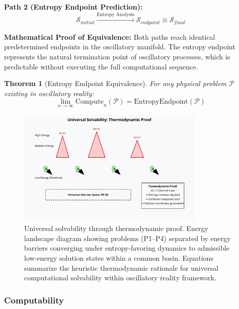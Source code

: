 \documentclass[12pt,a4paper]{article}
\newtheorem{theorem}{Theorem}
\begin{document}
\textbf{Path 2 (Entropy Endpoint Prediction):}
\begin{equation}
\mathcal{S}_{initial} \xrightarrow{\text{Entropy Analysis}} \mathcal{S}_{endpoint} \equiv \mathcal{S}_{final}
\end{equation}

\textbf{Mathematical Proof of Equivalence:}
Both paths reach identical predetermined endpoints in the oscillatory manifold. The entropy endpoint represents the natural termination point of oscillatory processes, which is predictable without executing the full computational sequence.

\begin{theorem}[Entropy Endpoint Equivalence]
For any physical problem $\mathcal{P}$ existing in oscillatory reality:
\begin{equation}
\lim_{n \to \infty} \text{Compute}_n(\mathcal{P}) = \text{EntropyEndpoint}(\mathcal{P})
\end{equation}
\end{theorem}


\begin{figure}[H]
    \centering
    \includegraphics[width=0.8\textwidth]{images/universal-solvability-thermodynamic-proof.pdf}
    \caption{Universal solvability through thermodynamic proof. Energy landscape diagram showing problems (P1–P4) separated by energy barriers converging under entropy-favoring dynamics to admissible low-energy solution states within a common basin. Equations summarize the heuristic thermodynamic rationale for universal computational solvability within oscillatory reality framework.}
    \label{fig:universal_solvability}
\end{figure}


\subsubsection{Computability}
\end{document}
